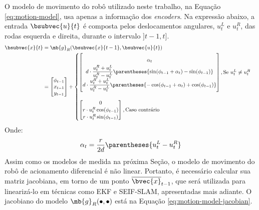 O modelo de movimento do robô utilizado neste trabalho, na Equação \ref{eq:motion-model}, usa apenas a informação dos \textit{encoders}. Na 
expressão abaixo, a entrada 
$\bsubvec{u}{t}$ é composta pelos deslocamentos angulares, $u_t^L$ e $u_t^R$, das rodas esquerda e direita, durante o intervalo $]t-1, t]$.
\newcommand{\factor}{d\cdot\dfrac{u_t^{R} + u_t^L}{u_t^R - u_t^L}}
\begin{equation}
\begin{aligned}
  \bsubvec{x}{t} &= \mb{g}_R(\bsubvec{x}{t-1}, \bsubvec{u}{t}) \\
  &= \begin{bmatrix}
      \phi_{t-1}  \\ x_{t-1} \\ y_{t-1}
    \end{bmatrix} + 
  \begin{cases}
  \renewcommand{\arraystretch}{1.8}
    \begin{bmatrix}
      \alpha_t
      \\
      \factor \parentheses{\sin(\phi_{t-1} + \alpha_t) - \sin(\phi_{t-1})} 
      \\
      \factor \parentheses{-\cos(\phi_{t-1} + \alpha_t) + \cos(\phi_{t-1})}
    \end{bmatrix}, \text{Se } u_t^L \neq u_t^R \\ 
    \\
    \renewcommand{\arraystretch}{1.1}
    \begin{bmatrix}
      0
      \\
      r\cdot u_t^R \cos(\phi_{t-1}) 
      \\
      r\cdot u_t^R \sin(\phi_{t-1}) 
    \end{bmatrix}, \text{Caso contrário}
  \end{cases}
\end{aligned}
\label{eq:motion-model}
\end{equation}
\renewcommand{\arraystretch}{1}
Onde:
\begin{equation}
  \alpha_t = \dfrac{r}{2d} \parentheses{u_t^L - u_t^R}
\end{equation}
Assim como os modelos de medida na próxima Seção, o modelo de movimento do 
robô de acionamento diferencial é não linear. Portanto, é necessário calcular 
sua matriz jacobiana, em torno de um ponto $\overline{\bvec{x}}_{t-1}$, que será 
utilizada para linearizá-lo em técnicas como EKF e SEIF-SLAM, apresentadas 
mais adiante. O jacobiano do modelo $\mb{g}_R(\bullet, \bullet)$ está na Equação 
\ref{eq:motion-model-jacobian}.
